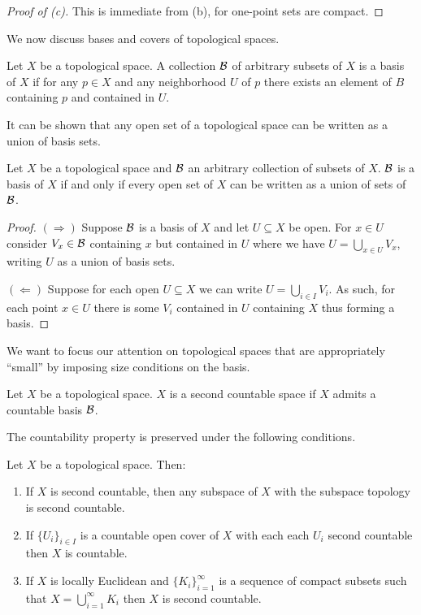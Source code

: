 \begin{proof}[Proof of (c)]
    This is immediate from (b), for one-point sets are compact. 
\end{proof}
We now discuss bases and covers of topological spaces. 
\begin{definition}\label{def: basis of topological space}
    Let $X$ be a topological space. A collection $\mathcal{B}$ of arbitrary subsets of $X$ is a basis of $X$ if for any $p\in X$ and any neighborhood $U$ of $p$ there exists an element of $B$ containing $p$ and contained in $U$. 
\end{definition}
It can be shown that any open set of a topological space can be written as a union of basis sets. 
\begin{proposition}\label{lem: basis iff every open is a union of elements}
    Let $X$ be a topological space and $\mathcal{B}$ an arbitrary collection of subsets of $X$. $\mathcal{B}$ is a basis of $X$ if and only if every open set of $X$ can be written as a union of sets of $\mathcal{B}$. 
\end{proposition}
\begin{proof}
    $(\Rightarrow)$ Suppose $\mathcal{B}$ is a basis of $X$ and let $U\subseteq X$ be open. For $x\in U$ consider $V_{x}\in\mathcal{B}$ containing $x$ but contained in $U$ where we have $U=\bigcup_{x\in U}V_{x}$, writing $U$ as a union of basis sets. 

    $(\Leftarrow)$ Suppose for each open $U\subseteq X$ we can write $U=\bigcup_{i\in I}V_{i}$. As such, for each point $x\in U$ there is some $V_{i}$ contained in $U$ containing $X$ thus forming a basis. 
\end{proof}
We want to focus our attention on topological spaces that are appropriately ``small'' by imposing size conditions on the basis. 
\begin{definition}\label{def: second countable space}
    Let $X$ be a topological space. $X$ is a second countable space if $X$ admits a countable basis $\mathcal{B}$.
\end{definition}
The countability property is preserved under the following conditions. 
\begin{proposition}\label{prop: second countability preserved}
    Let $X$ be a topological space. Then:
    \begin{enumerate}[label=(\roman*)]
        \item If $X$ is second countable, then any subspace of $X$ with the subspace topology is second countable. 
        \item If $\{U_{i}\}_{i\in I}$ is a countable open cover of $X$ with each each $U_{i}$ second countable then $X$ is countable. 
        \item If $X$ is locally Euclidean and $\{K_{i}\}_{i=1}^{\infty}$ is a sequence of compact subsets such that $X=\bigcup_{i=1}^{\infty}K_{i}$ then $X$ is second countable. 
    \end{enumerate}
\end{proposition}
